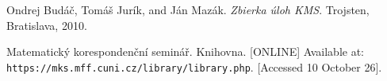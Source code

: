 \documentclass[11pt,a5paper]{article}
\begin{document}
\begin{thebibliography}{9}
 Ondrej Budáč, Tomáš Jurík, and Ján Mazák. 
	\emph{Zbierka úloh KMS}. Trojsten, Bratislava, 2010.
	
 Matematický korespondenční seminář. Knihovna. [ONLINE] Available at: \texttt{https://mks.mff.cuni.cz/library/library.php}. [Accessed 10 October 26].
\end{thebibliography}
\end{document}
